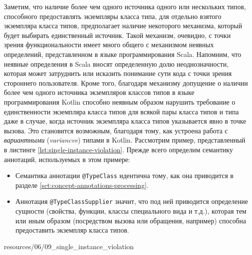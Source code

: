 Заметим, что наличие более чем одного источника одного или нескольких типов, способного предоставлять экземпляры класса типа, для отдельно взятого экземпляра класса типов, предполагает наличие некоторого механизма, который будет выбирать единственный источник. Такой механизм, очевидно, с точки зрения функциональности имеет много общего с механизмом неявных определений, представленном в языке программирования Scala. Напомним, что неявные определения в Scala вносят определенную долю неоднозначности, которая может затруднить или исказить понимание сути кода с точки зрения стороннего пользователя. Кроме того, благодаря механизму  допущение о наличии более чем одного источника экземпляров классов типов в языке программирования Kotlin способно неявным образом нарушить требование о  единственности экземпляра класса типов для всякой пары класса типов и типа даже в случае, когда источник экземпляра класса типов указывается явно в точке вызова. Это становится возможным, благодаря тому, как устроена работа с \emph{вариантными} (\emph{variancve}) типами в Kotlin. Рассмотрим пример, представленный в листинге \ref{lst:single-instance-violation}. Прежде всего определим семантику аннотаций, используемых в этом примере:
\begin{itemize}
    \item Семантика аннотации \lstinline{@TypeClass} идентична тому, как она приводится в разделе \ref{sct:concept-annotations-processing}.  
    \item Аннотация \lstinline{@TypeClassSupplier} значит, что под ней приводится определение сущности (свойства, функции, классы специального вида и т.д.), которая тем или иным образом (посредством вызова или обращения, например) способна предоставить экземпляр класса типов.     
\end{itemize}


{resources/06/09_single_instance_violation}

